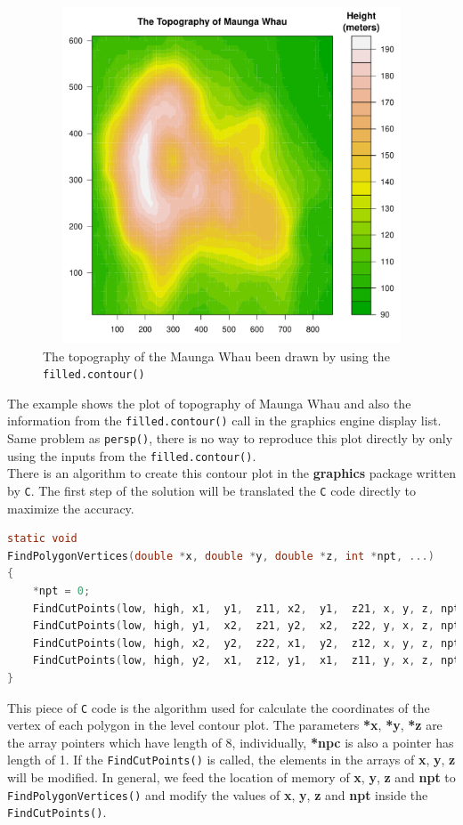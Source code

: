 \documentclass[11pt]{report}
\begin{document}
\begin{figure}[h]
	\begin{center}
		\includegraphics[height = 10cm, width = 12cm]{figure/filled_example_1.pdf}
		\caption{The topography of the Maunga Whau been drawn by using the \texttt{filled.contour()}}
		\label{figure_3.6}
	\end{center}
\end{figure}

The example shows the plot of topography of Maunga Whau and also the information from the \texttt{filled.contour()} call in the graphics engine display list. Same problem as \texttt{persp()}, there is no way to reproduce this plot directly by only using the inputs from the \texttt{filled.contour()}.\\

There is an algorithm to create this contour plot in the \textbf{graphics} package written by \texttt{C}. The first step of the solution will be translated the \texttt{C} code directly to maximize the accuracy.\\

\begin{lstlisting}[language = C]
static void
FindPolygonVertices(double *x, double *y, double *z, int *npt, ...)
{
    *npt = 0;
    FindCutPoints(low, high, x1,  y1,  z11, x2,  y1,  z21, x, y, z, npt);
    FindCutPoints(low, high, y1,  x2,  z21, y2,  x2,  z22, y, x, z, npt);
    FindCutPoints(low, high, x2,  y2,  z22, x1,  y2,  z12, x, y, z, npt);
    FindCutPoints(low, high, y2,  x1,  z12, y1,  x1,  z11, y, x, z, npt);
}
\end{lstlisting}
This piece of \texttt{C} code is the algorithm used for calculate the coordinates of the vertex of each polygon in the level contour plot. The parameters \textbf{*x}, \textbf{*y}, \textbf{*z} are the array pointers which have length of 8, individually, \textbf{*npc} is also a pointer has length of 1. If the \texttt{FindCutPoints()} is called, the elements in the arrays of \textbf{x}, \textbf{y}, \textbf{z} will be modified. In general, we feed the location of memory of \textbf{x}, \textbf{y}, \textbf{z} and \textbf{npt} to \texttt{FindPolygonVertices()} and modify the values of \textbf{x}, \textbf{y}, \textbf{z} and \textbf{npt} inside the \texttt{FindCutPoints()}.\\
\end{document}
